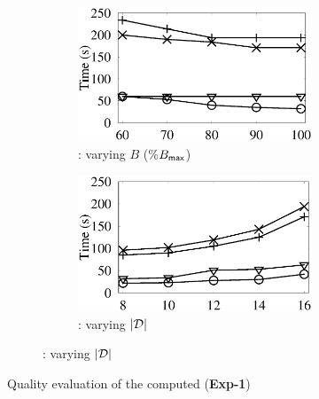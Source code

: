 \begin{figure}[tb!]
\begin{subfigure}[b]{1.00\textwidth}
  		\begin{subfigure}[b]{0.256\textwidth}
          \centering
          \includegraphics[width=1\textwidth]{fig/vary_b_tpcds.eps}
          \begin{center}
            \vspace{-2ex}\caption{\tpcds: varying $B$ (\%$B_{\protect\mathsf{max}}$)}
            \label{tpcds-1-varyB} 
          \end{center}
          \vspace{-1ex}
        \end{subfigure}
         \hspace{-2.8ex}
  		\begin{subfigure}[b]{0.256\textwidth}
          \centering
          \includegraphics[width=1\textwidth]{fig/vary_d_tpcds.eps}
          \begin{center}
            \vspace{-2ex}
           \caption{\tpcds: varying $|\mathcal D|$}
            \label{tpcds-1-varyD} 
          \end{center}
        \end{subfigure}
\end{subfigure}
\vspace{-4.0ex}
\caption{Quality evaluation of the computed \bdss ({\bf Exp-1})}
\label{exp-quality}
\vspace{-2.5ex}
\end{figure}



